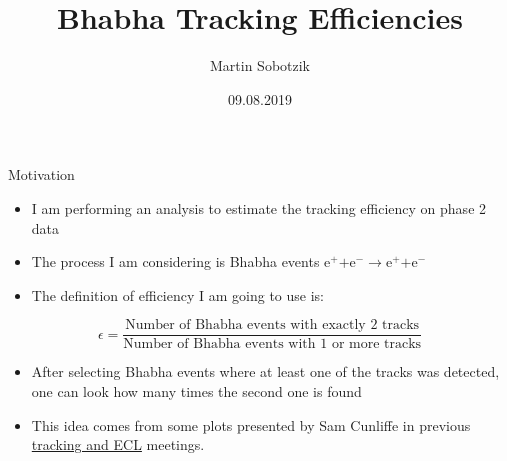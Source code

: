 \documentclass[10pt]{beamer}
\title{Bhabha Tracking Efficiencies}
\date{09.08.2019}
\author{Martin Sobotzik}
\institute{Johannes Gutenberg-Universit\"at Mainz}
\begin{document}
\maketitle
%



\begin{frame}{Motivation}

\begin{itemize}	
	\item I am performing an analysis to estimate the tracking efficiency on phase 2 data
	\item The process I am considering is Bhabha events $\textrm{e}^+ \textrm{+e}^- \rightarrow \textrm{e}^+ \textrm{+e}^- $ 
	\item The definition of efficiency I am going to use is:

\end{itemize}
	\begin{equation*}
		\epsilon = \frac{\textrm{Number of Bhabha events with exactly 2 tracks}}{\textrm{Number of Bhabha events with 1 or more tracks}}
	\end{equation*}
	
	\begin{itemize}
		\item After selecting Bhabha events where at least one of the tracks was detected, one can look how many times the second one is found
		\item  This idea comes from some plots presented by Sam Cunliffe in previous  \href{https://confluence.desy.de/display/BI/ECL+Meetings?preview=/84320165/109161400/SCunliffe181123-ECL.pdf}{tracking and ECL} meetings.
	\end{itemize}





\end{frame}
	
\end{document}
